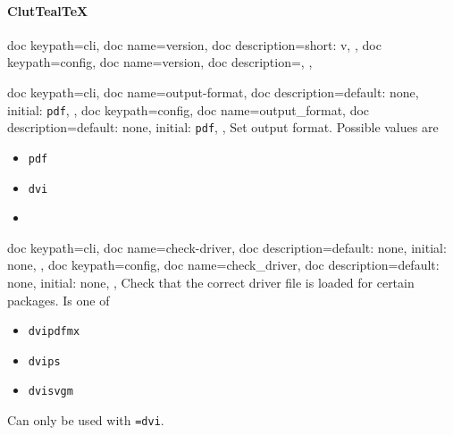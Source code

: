 \documentclass[a4paper, 11pt]{scrartcl}
\newcommand\CluttealTeX{ClutTeal\TeX\xspace}
\begin{document}
\paragraph{\CluttealTeX}
\begin{docKeys}[
	]{
		{
			doc keypath=cli,
			doc name=version,
			doc description={short: v},
		},
		{
			doc keypath=config,
			doc name=version,
			doc description={},
		},
	}
\end{docKeys}
\begin{docKeys}[
		doc parameter={=\meta{output\_format}},
	]{
		{
			doc keypath=cli,
			doc name=output-format,
			doc description={default: none, initial: \texttt{pdf}},
		},
		{
			doc keypath=config,
			doc name=output_format,
			doc description={default: none, initial: \texttt{pdf}},
		},
	}
	Set output format.
	Possible values are
	\begin{multicols}{3}
		\begin{itemize}
			\item \texttt{pdf}
			\item \texttt{dvi}
			\item[]
		\end{itemize}
	\end{multicols}
\end{docKeys}
\begin{docKeys}[
		doc parameter={=\meta{check\_driver}},
	]{
		{
			doc keypath=cli,
			doc name=check-driver,
			doc description={default: none, initial: none},
		},
		{
			doc keypath=config,
			doc name=check_driver,
			doc description={default: none, initial: none},
		},
	}
	Check that the correct driver file is loaded for certain packages.
	Is one of
	\begin{multicols}{3}
		\begin{itemize}
			\item \texttt{dvipdfmx}
			\item \texttt{dvips}
			\item \texttt{dvisvgm}
		\end{itemize}
	\end{multicols}
	Can only be used with \texttt{=dvi}.
\end{docKeys}
\end{document}
